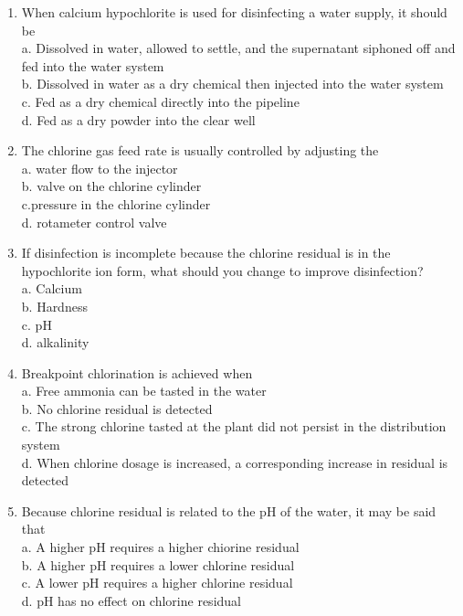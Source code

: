 \begin{enumerate}[1.]
\item When calcium hypochlorite is used for disinfecting a water supply, it should be\\
a. Dissolved in water, allowed to settle, and the supernatant siphoned off and fed into the water system\\
b. Dissolved in water as a dry chemical then injected into the water system\\
c. Fed as a dry chemical directly into the pipeline\\
d. Fed as a dry powder into the clear well\\
\item The chlorine gas feed rate is usually controlled by adjusting the\\
a. water flow to the injector\\
b. valve on the chlorine cylinder\\
c.pressure in the chlorine cylinder\\
d. rotameter control valve\\
\item If disinfection is incomplete because the chlorine residual is in the hypochlorite ion form, what should you change to improve disinfection?\\
a. Calcium\\
b. Hardness\\
c. $\mathrm{pH}$\\
d. alkalinity\\
\item Breakpoint chlorination is achieved when\\
a. Free ammonia can be tasted in the water\\
b. No chlorine residual is detected\\
c. The strong chlorine tasted at the plant did not persist in the distribution system\\
d. When chlorine dosage is increased, a corresponding increase in residual is detected\\
\item Because chlorine residual is related to the $\mathrm{pH}$ of the water, it may be said that\\
a. A higher $\mathrm{pH}$ requires a higher chiorine residual\\
b. A higher $\mathrm{pH}$ requires a lower chlorine residual\\
c. A lower $\mathrm{pH}$ requires a higher chlorine residual\\
d. $\mathrm{pH}$ has no effect on chlorine residual\\

\end{enumerate}
